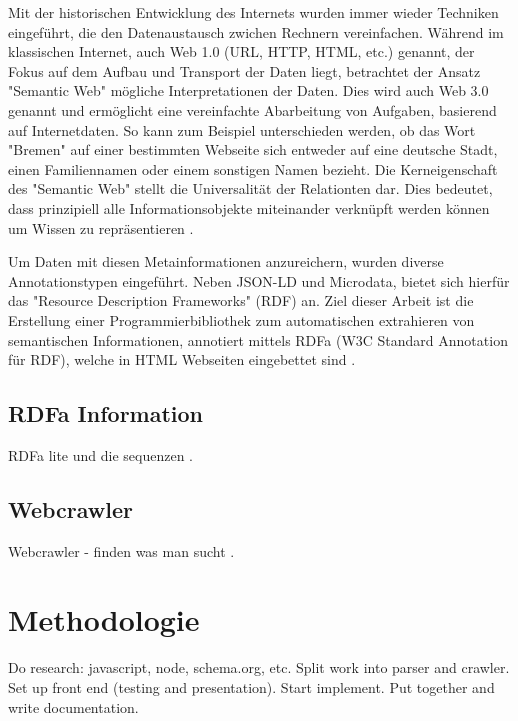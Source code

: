 \documentclass[hidelinks, a4paper, 11pt]{article} %
\begin{document}
Mit der historischen Entwicklung des Internets wurden immer wieder Techniken eingef\"uhrt, die den Datenaustausch zwichen Rechnern vereinfachen. W\"ahrend im klassischen Internet, auch Web 1.0 (URL, HTTP, HTML, etc.) genannt, der Fokus auf dem Aufbau und Transport der Daten liegt, betrachtet der Ansatz "Semantic Web" m\"ogliche Interpretationen der Daten. Dies wird auch Web 3.0 genannt und ermöglicht eine vereinfachte Abarbeitung von Aufgaben, basierend auf Internetdaten. So kann zum Beispiel unterschieden werden, ob das Wort "Bremen" auf einer bestimmten Webseite sich entweder auf eine deutsche Stadt, einen Familiennamen oder einem sonstigen Namen bezieht. Die Kerneigenschaft des "Semantic Web" stellt die Universalit\"at der Relationten dar. Dies bedeutet, dass prinzipiell alle Informationsobjekte miteinander verkn\"upft werden können um Wissen zu repr\"asentieren \cite{berners2001semantic}. \linebreak 

Um Daten mit diesen Metainformationen anzureichern, wurden diverse Annotationstypen eingef\"uhrt. Neben JSON-LD und Microdata, bietet sich hierfür das "Resource Description Frameworks" (RDF) an. Ziel dieser Arbeit ist die Erstellung einer Programmierbibliothek zum automatischen extrahieren von semantischen Informationen, annotiert mittels RDFa (W3C Standard Annotation f\"ur RDF), welche in HTML Webseiten eingebettet sind \cite{halb2008building}.

\subsection{RDFa Information}

RDFa lite und die sequenzen \cite{adida2008rdfa}.


\subsection{Webcrawler}

Webcrawler - finden was man sucht \cite{pinkerton2000webcrawler}.




\section{Methodologie}

Do research: javascript, node, schema.org, etc.
Split work into parser and crawler.
Set up front end (testing and presentation).
Start implement.
Put together and write documentation.
\end{document}
